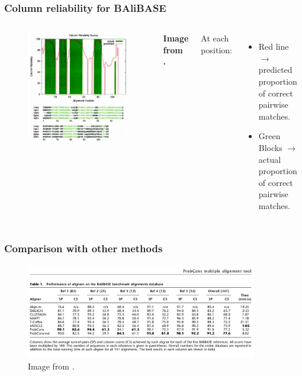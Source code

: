 \begin{frame}
    \frametitle{Column reliability for BAliBASE}
    \begin{columns}
            \begin{figure}[t]
                \includegraphics[width=0.6\textheight]{img/exp1.png}
            \end{figure}
            \textbf{Image from \cite{do2005probcons}.} 

            At each position:
            \begin{itemize}
                \item Red line $\rightarrow$ predicted proportion of correct pairwise matches.
                \item Green Blocks $\rightarrow$ actual proportion of correct pairwise matches.
            \end{itemize}
    \end{columns}
\end{frame}

\begin{frame}
    \frametitle{Comparison with other methods}
    \begin{figure}[t]
        \includegraphics[width=0.9\textwidth]{img/exp2.png}
        \caption{Image from \cite{do2005probcons}.}
    \end{figure}
\end{frame}